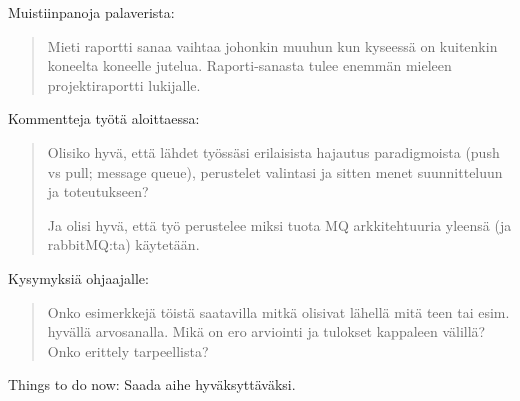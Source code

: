 \begin{it}
	Muistiinpanoja palaverista:
	\begin{quote}
	Mieti raportti sanaa vaihtaa johonkin muuhun kun kyseessä on kuitenkin koneelta koneelle jutelua. Raporti-sanasta tulee enemmän mieleen projektiraportti lukijalle.
	\end{quote}
	
	Kommentteja työtä aloittaessa:
	\begin{quote}
		Olisiko hyvä, että lähdet työssäsi erilaisista hajautus paradigmoista (push vs pull; message queue), perustelet valintasi ja sitten menet suunnitteluun ja toteutukseen?
		
		Ja olisi hyvä, että työ perustelee miksi tuota MQ arkkitehtuuria yleensä (ja rabbitMQ:ta) käytetään.
	\end{quote}
	
	Kysymyksiä ohjaajalle:
	\begin{quote}
		Onko esimerkkejä töistä saatavilla mitkä olisivat lähellä mitä teen tai esim. hyvällä arvosanalla.
		Mikä on ero arviointi ja tulokset kappaleen välillä? Onko erittely tarpeellista?
	\end{quote}
	
	Things to do now:
	Saada aihe hyväksyttäväksi.
\end{it}